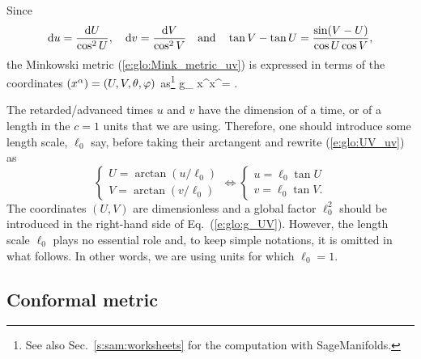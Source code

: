 Since
\[
    \mathrm{d} u = \frac{\mathrm{d} U}{\cos^2 U}, \quad \mathrm{d} v = \frac{\mathrm{d} V}{\cos^2 V}
    \quad\mbox{and}\quad
    \tan V - \tan U = \frac{\sin(V-U)}{\cos U \cos V},
\]
the Minkowski metric (\ref{e:glo:Mink_metric_uv})
is expressed in terms of the coordinates $(x^\alpha)=(U,V,\theta,\varphi)$
as\footnote{See also Sec.~\ref{s:sam:worksheets} for the computation
with SageManifolds.}
\be \label{e:glo:g_UV}
    g_{\mu\nu} \D x^\mu \D x^\nu = 
     .
\ee

\begin{remark}
The retarded/advanced times $u$ and $v$ have the dimension of a time, or of a
length in the $c=1$ units that we are using. Therefore, one should introduce
some length scale, $\ell_0$ say, before taking their arctangent and rewrite
(\ref{e:glo:UV_uv}) as
\[
    \left\{ \begin{array}{l}
    U = \arctan (u/\ell_0) \\
    V = \arctan (v/\ell_0)
    \end{array} \right.
    \iff
   \left\{ \begin{array}{l}
    u = \ell_0 \tan U \\
    v = \ell_0 \tan V .
    \end{array} \right.
\]
The coordinates $(U,V)$ are dimensionless and a global factor $\ell_0^2$ should be
introduced in the right-hand side of Eq.~(\ref{e:glo:g_UV}).
However, the length scale $\ell_0$ plays no essential role and, to keep simple notations,
it is omitted in what follows. In other words, we are using units for
which $\ell_0=1$.
\end{remark}

\subsection{Conformal metric} \label{s:glo:conf_metric}

